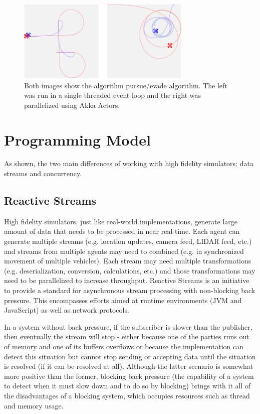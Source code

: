 \documentclass{article}
\begin{document}
\begin{figure}
	\centering
	\includegraphics[width=8.3cm]{single-vs-multi-thread}
	\caption{Both images show the algorithm pursue/evade algorithm. The left was run in a single threaded event loop and the right was parallelized using Akka Actors.}\label{fig:single-vs-multi-thread}
\end{figure}


\section{Programming Model}
As shown, the two main differences of working with high fidelity simulators: data streams and concurrency.

\subsection{Reactive Streams}
High fidelity simulators, just like real-world implementations, generate large amount of data that needs to be processed in near real-time. Each agent can generate multiple streams (e.g. location updates, camera feed, LIDAR feed, etc.) and streams from multiple agents may need to combined (e.g. in synchronized movement of multiple vehicles). Each stream may need multiple transformations (e.g. deserialization, conversion, calculations, etc.) and those transformations may need to be parallelized to increase throughput.
Reactive Streams is an initiative to provide a standard for asynchronous stream processing with non-blocking back pressure. This encompasses efforts aimed at runtime environments (JVM and JavaScript) as well as network protocols. \cite{reactive-manifesto} 

In a system without back pressure, if the subscriber is slower than the publisher, then eventually the stream will stop - either because one of the parties runs out of memory and one of its buffers overflows or because the implementation can detect this situation but cannot  stop sending or accepting data until the situation is resolved (if it can be resolved at all). Although the latter scenario is somewhat more positive than the former, blocking back pressure (the capability of a system to detect when it must slow down and to do so by blocking) brings with it all of the disadvantages of a blocking system, which occupies resources such as thread and memory usage. \cite{reactive-web-apps}
\end{document}

